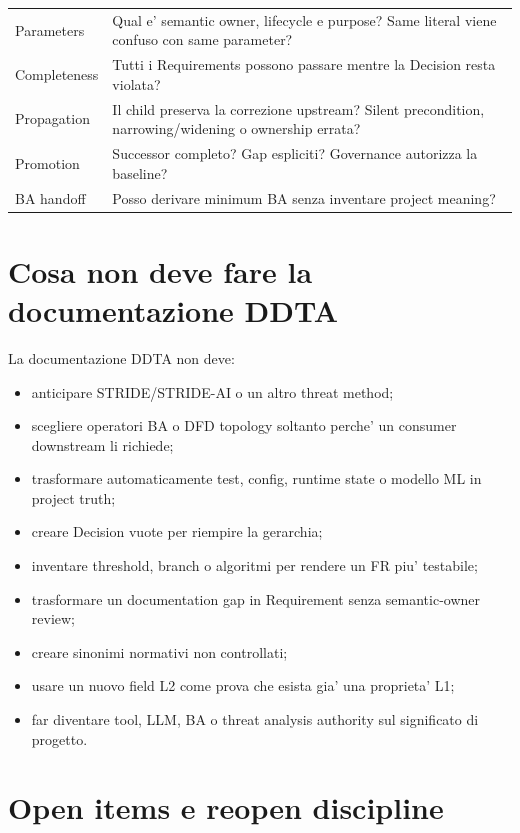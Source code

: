 \documentclass[11pt,a4paper]{article}
\begin{document}
\begin{longtable}{L{36mm}L{110mm}}
Parameters & Qual e' semantic owner, lifecycle e purpose? Same literal viene confuso con same parameter? \\
Completeness & Tutti i Requirements possono passare mentre la Decision resta violata? \\
Propagation & Il child preserva la correzione upstream? Silent precondition, narrowing/widening o ownership errata? \\
Promotion & Successor completo? Gap espliciti? Governance autorizza la baseline? \\
BA handoff & Posso derivare minimum BA senza inventare project meaning? \\
\bottomrule
\end{longtable}

\section{Cosa non deve fare la documentazione DDTA}

La documentazione DDTA non deve:
\begin{itemize}
  \item anticipare STRIDE/STRIDE-AI o un altro threat method;
  \item scegliere operatori BA o DFD topology soltanto perche' un consumer downstream li richiede;
  \item trasformare automaticamente test, config, runtime state o modello ML in project truth;
  \item creare Decision vuote per riempire la gerarchia;
  \item inventare threshold, branch o algoritmi per rendere un FR piu' testabile;
  \item trasformare un documentation gap in Requirement senza semantic-owner review;
  \item creare sinonimi normativi non controllati;
  \item usare un nuovo field L2 come prova che esista gia' una proprieta' L1;
  \item far diventare tool, LLM, BA o threat analysis authority sul significato di progetto.
\end{itemize}

\section{Open items e reopen discipline}
\opentag
\end{document}
